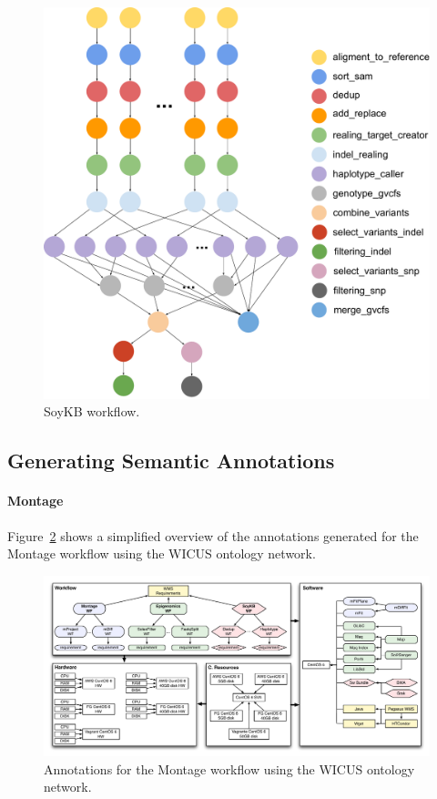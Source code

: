 \begin{figure}[!htb]
	\centering
	\includegraphics[width=0.95\linewidth]{figures/workflow-soybean}
	\caption{SoyKB workflow.}
	\label{fig:workflow-soykb}
\end{figure}


\subsection{Generating Semantic Annotations}

\paragraph{\textbf{Montage}}
Figure~\ref{fig:annotations} shows a simplified overview of the annotations generated for the Montage workflow using the WICUS ontology network.

\begin{figure}[!htb]
	\centering
	\includegraphics[width=\linewidth]{figures/annotations}
	\caption{Annotations for the Montage workflow using the WICUS ontology network.}
	\label{fig:annotations}
\end{figure}

